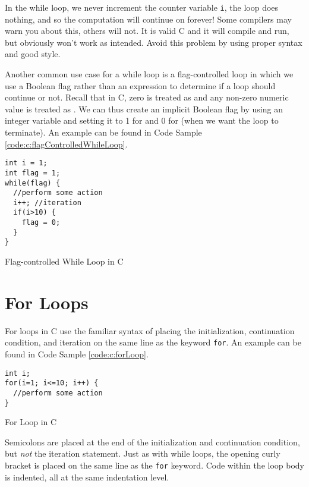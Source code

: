 In the while loop, we never increment the counter variable \texttt{i}, 
the loop does nothing, and so the computation will continue on
forever!  Some compilers may warn you about this, others will not.  It
is valid C and it will compile and run, but obviously won't work as intended.
Avoid this problem by using proper syntax and good style.

Another common use case for a while loop is a flag-controlled loop in which
we use a Boolean flag rather than an expression to determine if a loop
should continue or not.  Recall that in C, zero is treated as \False and 
any non-zero numeric value is treated as \True.  We can thus create an
implicit Boolean flag by using an integer variable and setting it to 1 for
\True and 0 for \False (when we want the loop to terminate).  An example
can be found in Code Sample \ref{code:c:flagControlledWhileLoop}.

\begin{listing}
\begin{verbatim}
int i = 1;
int flag = 1;
while(flag) {
  //perform some action
  i++; //iteration  
  if(i>10) {
    flag = 0;
  }
}
\end{verbatim}
  \caption{Flag-controlled While Loop in C}
  \label{code:c:flagControlledWhileLoop}
\end{listing}

\section{For Loops}

For loops in C use the familiar syntax of placing the initialization, continuation
condition, and iteration on the same line as the keyword \texttt{for}.
An example can be found in Code Sample \ref{code:c:forLoop}.

\begin{listing}[H]
\begin{verbatim}
int i;
for(i=1; i<=10; i++) {
  //perform some action
}
\end{verbatim}
  \caption{For Loop in C}
  \label{code:c:forLoop}
\end{listing}

Semicolons are placed at the end of the initialization and
continuation condition, but \emph{not} the iteration statement.  Just as with while
loops, the opening curly bracket is placed on the same line as the \texttt{for}
keyword.  Code within the loop body is indented, all at the same indentation level.

